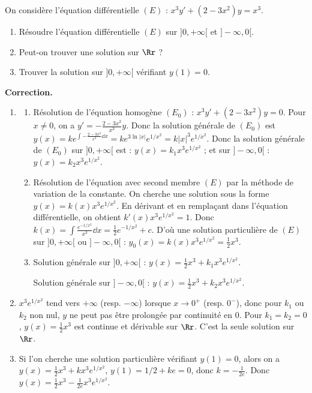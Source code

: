 \documentclass[class=report,crop=false]{standalone}
\begin{document}
\begin{exemple}
On considère l'équation différentielle
$(E)$ : $x^3y'+(2-3x^2)y=x^3$.

\begin{enumerate}
\item Résoudre l'équation différentielle $(E)$ sur $]0,+\infty[$ et
  $]-\infty,0[$.

\item Peut-on trouver une solution sur $\Rr$ ?

\item Trouver la solution sur $]0,+\infty[$ vérifiant $y(1)=0$.
\end{enumerate}


\bigskip
\textbf{Correction.}

\begin{enumerate}
  \item
  \begin{enumerate}
    \item Résolution de l'équation homogène $(E_0)$ :
$x^3y'+(2-3x^2)y=0$.
Pour $x\neq 0$, on a $y'=-\frac{2-3x^2}{x^3}y$. Donc la solution générale
de $(E_0)$ est $y(x)=k e^{\int -\frac{2-3x^2}{x^3}\dd x}
=k e^{3\ln |x|}e^{1/x^2}=k|x|^3e^{1/x^2}$.
Donc la solution générale de $(E_0)$ sur $]0,+\infty[$ est :
$y(x)= k_1 x^3e^{1/x^2}$ ; et sur $]-\infty,0[$ : $y(x)= k_2 x^3e^{1/x^2}$.

    \item Résolution de l'équation avec second membre $(E)$ par la méthode de variation de
la constante.
On cherche une solution sous la forme $y(x)=k(x)x^3e^{1/x^2}$. En dérivant
et en remplaçant dans l'équation différentielle, on obtient
$k'(x) x^3e^{1/x^2} =1. $ Donc $k(x)=\int \frac{e^{-1/x^2}}{x^3}\dd x
=\frac{1}{2}e^{-1/x^2}+c$. D'où une solution particulière de $(E)$ sur
$]0,+\infty[$ ou $]-\infty,0[$ :
$y_0(x)=k(x)x^3e^{1/x^2} =\frac{1}{2}x^3$.

    \item Solution générale sur $]0,+\infty[$ :
$y(x)=\frac{1}{2}x^3+k_1x^3e^{1/x^2}$.

Solution générale sur $]-\infty,0[$ :
$y(x)=\frac{1}{2}x^3+k_2x^3e^{1/x^2}$.
  \end{enumerate}

  \item  $x^3e^{1/x^2}$ tend vers $+\infty$ (resp. $-\infty$) lorsque $x \to 0^+$ (resp. $0^-$),
donc pour $k_1$ ou $k_2$ non nul, $y$ ne
peut pas être prolongée par continuité en $0$.
Pour $k_1=k_2=0$, $y(x)=\frac{1}{2}x^3$ est continue et dérivable sur
$\Rr$. C'est la seule solution sur $\Rr$.

  \item Si l'on cherche une solution particulière vérifiant $y(1)=0$,
alors on
a $y(x)=\frac{1}{2}x^3+kx^3e^{1/x^2}$, $y(1)=1/2+ke=0$, donc $k=-\frac{1}{2e}$. Donc
$y(x)=\frac{1}{2}x^3-\frac{1}{2e}x^3e^{1/x^2}$.
\end{enumerate}
\end{exemple}
\end{document}
